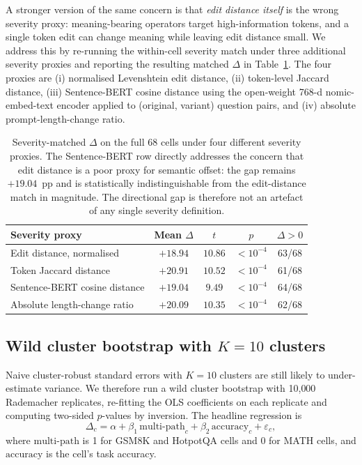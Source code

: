 \documentclass[11pt]{article}
\begin{document}
A stronger version of the same concern is that \emph{edit distance itself} is the wrong severity proxy: meaning-bearing operators target high-information tokens, and a single token edit can change meaning while leaving edit distance small. We address this by re-running the within-cell severity match under three additional severity proxies and reporting the resulting matched $\Delta$ in Table~\ref{tab:severity_proxies}. The four proxies are (i) normalised Levenshtein edit distance, (ii) token-level Jaccard distance, (iii) Sentence-BERT cosine distance using the open-weight 768-d nomic-embed-text encoder applied to (original, variant) question pairs, and (iv) absolute prompt-length-change ratio.

\begin{table}[t]
\centering
\footnotesize
\setlength{\tabcolsep}{3pt}
\begin{tabular}{@{}p{3.0cm}cccc@{}}
\toprule
\textbf{Severity proxy} & \textbf{Mean $\Delta$} & $t$ & $p$ & $\Delta>0$ \\
\midrule
Edit distance, normalised      & $+18.94$ & $10.86$ & $<10^{-4}$ & 63/68 \\
Token Jaccard distance         & $+20.91$ & $10.52$ & $<10^{-4}$ & 61/68 \\
Sentence-BERT cosine distance  & $+19.04$ & $9.49$ & $<10^{-4}$ & 64/68 \\
Absolute length-change ratio   & $+20.09$ & $10.35$ & $<10^{-4}$ & 62/68 \\
\bottomrule
\end{tabular}
\caption{Severity-matched $\Delta$ on the full 68 cells under four different severity proxies. The Sentence-BERT row directly addresses the concern that edit distance is a poor proxy for semantic offset: the gap remains $+19.04$~pp and is statistically indistinguishable from the edit-distance match in magnitude. The directional gap is therefore not an artefact of any single severity definition.}
\label{tab:severity_proxies}
\end{table}

\subsection{Wild cluster bootstrap with $K{=}10$ clusters}
\label{sec:wild_K6}

Naive cluster-robust standard errors with $K{=}10$ clusters are still likely to under-estimate variance. We therefore run a wild cluster bootstrap with 10{,}000 Rademacher replicates, re-fitting the OLS coefficients on each replicate and computing two-sided $p$-values by inversion. The headline regression is
\begin{equation}
\Delta_c = \alpha + \beta_1\,\mathrm{multi\text{-}path}_c + \beta_2\,\mathrm{accuracy}_c + \varepsilon_c,
\end{equation}
where $\mathrm{multi\text{-}path}$ is 1 for GSM8K and HotpotQA cells and 0 for MATH cells, and $\mathrm{accuracy}$ is the cell's task accuracy.
\end{document}
